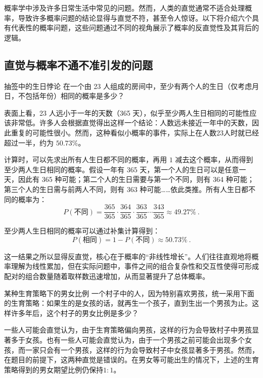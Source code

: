 
概率学中涉及许多日常生活中常见的问题。然而，人类的直觉通常不适合处理概率，导致许多概率问题的结论显得与直觉不符，甚至令人惊讶。以下将介绍六个具有代表性的概率问题，这些问题通过不同的视角展示了概率的反直觉性及其背后的逻辑。

\subsection{直觉与概率不通不准引发的问题}

\begin{example}{抽签中的生日悖论}
在一个由 23 人组成的房间中，至少有两个人的生日（仅考虑月日，不包括年份）相同的概率是多少？
\end{example}

表面上看，23 人远小于一年的天数（365 天），似乎至少两人生日相同的可能性应该非常低。许多人会根据直觉得出这样一个结论：人数远未接近一年中的天数，因此重复的可能性很小。然而，这种看似小概率的事件，实际上在人数23人时就已经超过一半，约为 $50.73\%$。

计算时，可以先求出所有人生日都不同的概率，再用 $1$ 减去这个概率，从而得到至少两人生日相同的概率。假设一年有 365 天，第一个人的生日可以是任意一天，因此有 365 种可能；第二个人的生日需要与第一个不同，则有 364 种可能；第三个人的生日需与前两人不同，则有 363 种可能……依此类推。所有人生日都不同的概率为：
\begin{equation}
P(\text{不同}) = \frac{365}{365} \cdot \frac{364}{365} \cdot \frac{363}{365} \cdots \frac{343}{365}\approx49.27\%~.
\end{equation}

至少两人生日相同的概率可以通过补集计算得到：
\begin{equation}
P(\text{相同})= 1 - P(\text{不同})\approx50.73\%~.
\end{equation}

这一结果之所以显得反直觉，核心在于概率的“非线性增长”。人们往往直观地将概率理解为线性累加，但在实际问题中，事件之间的组合复杂性和交互性使得可形成配对的组合数量随着取样数迅速增加，从而显著提升了总体概率。

\begin{example}{某种生育策略下的男女比例}
一个村子中的人，因为特别喜欢男孩，统一采用下面的生育策略：如果生的是女孩的话，就再生一个孩子，直到生出一个男孩为止。这样许多年后，这个村子的男女比例是多少？
\end{example}

一些人可能会直觉认为，由于生育策略偏向男孩，这样的行为会导致村子中男孩显著多于女孩。也有一些人可能会直觉认为，由于一个男孩之前可能会出现多个女孩，而一家只会有一个男孩，这样的行为会导致村子中女孩显著多于男孩。然而，在题目的前提下，这两种直觉是错误的。在男女等可能出生的情况下，上述的生育策略得到的男女期望比例仍保持$1:1$。

